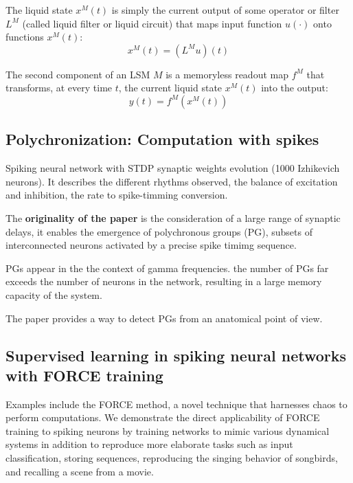 \documentclass[12pt]{article}
\begin{document}
The liquid state $x^M(t)$ is simply the current output of some operator or filter $L^M$ (called liquid filter or liquid circuit) that maps input function $u(\cdot)$ onto functions $x^M(t)$: \begin{equation}
x^M(t) = (L^M u)(t)
\end{equation}

The second component of an LSM $M$ is a memoryless readout map $f^M$ that transforms, at every time $t$, the current liquid state $x^M(t)$ into the output: \begin{equation}
y(t) = f^M(x^M(t))
\end{equation}


\subsection{Polychronization: Computation with spikes \cite{izhikevich2006polychronization}}

Spiking neural network with STDP synaptic weights evolution (1000 Izhikevich neurons). It describes the different rhythms observed, the balance of excitation and inhibition, the rate to spike-timming conversion.

The \textbf{originality of the paper} is the consideration of a large range of synaptic delays, it enables the emergence of polychronous groups (PG), subsets of interconnected neurons activated by a precise spike timimg sequence.

PGs appear in the the context of gamma frequencies. the number of PGs far exceeds the number of neurons in the network, resulting in a large memory capacity of the system.

The paper provides a way to detect PGs from an anatomical point of view.


\subsection{Supervised learning in spiking neural networks with FORCE training \cite{nicola2016supervised}}

Examples include the FORCE method, a novel technique that harnesses chaos to perform computations. We demonstrate the direct applicability of FORCE training to spiking neurons by training networks to mimic various dynamical systems in addition to reproduce more elaborate tasks such as input classification, storing sequences, reproducing the singing behavior of songbirds, and recalling a scene from a movie.
\end{document}
